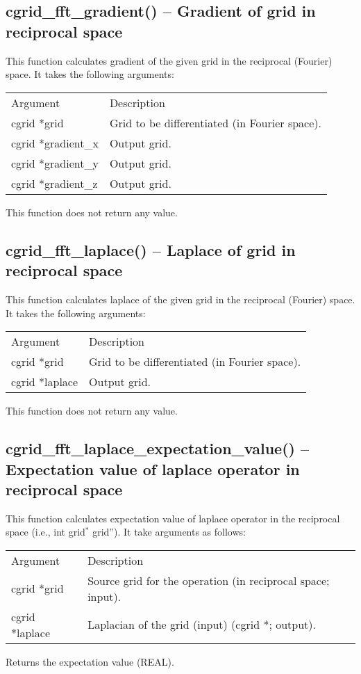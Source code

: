 \documentclass[12pt,letterpaper]{report}
\begin{document}
\subsection{cgrid\_fft\_gradient() -- Gradient of grid in reciprocal space}

This function calculates gradient of the given grid in the reciprocal (Fourier) space. It takes the following arguments:                                                                                     
\begin{longtable}{p{} p{}}
Argument & Description\\
\cline{1-2}
cgrid *grid & Grid to be differentiated (in Fourier space).\\                                                          
cgrid *gradient\_x & Output grid.\\
cgrid *gradient\_y & Output grid.\\
cgrid *gradient\_z & Output grid.\\
\end{longtable}
\noindent
This function does not return any value.

\subsection{cgrid\_fft\_laplace() -- Laplace of grid in reciprocal space}

This function calculates laplace of the given grid in the reciprocal (Fourier) space. It takes the following arguments:                                                                                     
\begin{longtable}{p{} p{}}
Argument & Description\\
\cline{1-2}
cgrid *grid & Grid to be differentiated (in Fourier space).\\                                                          
cgrid *laplace & Output grid.\\
\end{longtable}
\noindent
This function does not return any value.

\subsection{cgrid\_fft\_laplace\_expectation\_value() -- Expectation value of laplace operator in reciprocal space}

This function calculates expectation value of laplace operator in the reciprocal space (i.e., int grid$^*$ grid''). It take arguments as follows:
\begin{longtable}{p{} p{}}
Argument & Description\\
\cline{1-2}
cgrid *grid & Source grid for the operation (in reciprocal space; input).\\
cgrid *laplace & Laplacian of the grid (input) (cgrid *; output).\\
\end{longtable}
\noindent
Returns the expectation value (REAL).
\end{document}
